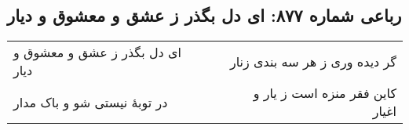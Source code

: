 \begin{center}
\section*{رباعی شماره ۸۷۷: ای دل بگذر ز عشق و معشوق و دیار}
\label{sec:0877}
\begin{longtable}{l p{0.5cm} r}
ای دل بگذر ز عشق و معشوق و دیار
&&
گر دیده وری ز هر سه بندی زنار
\\
در توبهٔ نیستی شو و باک مدار
&&
کاین فقر منزه است ز یار و اغیار
\\
\end{longtable}
\end{center}
